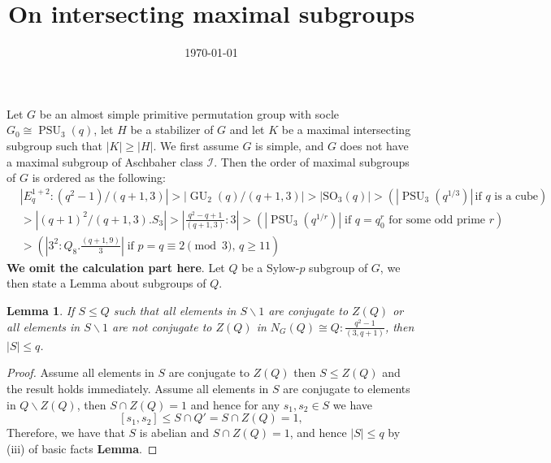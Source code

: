 \documentclass[12pt,reqno]{amsart}
\title[On intersecting maximal subgroups]{On intersecting maximal subgroups}
\date{\today}
\newcommand{\PSU}{\operatorname{PSU}}
\newcommand{\GU}{\operatorname{GU}}
\theoremstyle{plain}
\newtheorem{lemma}[proposition]{Lemma}
\theoremstyle{definition}
\begin{document}
	Let $G$ be an almost simple primitive permutation group with socle $G_0\cong \PSU_3(q)$, let $H$ be a stabilizer of $G$ and let $K$ be a maximal intersecting subgroup such that $|K|\ge |H|$.
	We first assume $G$ is simple, and $G$ does not have a maximal subgroup of Aschbaher class $\mathcal{I}$. Then the order of maximal subgroups of $G$ is ordered as the following:
	\begin{equation}\label{order}
		\begin{aligned}
		&|E_q^{1+2}{:}(q^2-1)/(q+1,3)|>|\GU_2(q)/(q+1,3)|>|\mathrm{SO}_3(q)|>(|\PSU_3(q^{1/3})|\, \text{if $q$ is a cube})\\
		&>|(q+1)^2/(q+1,3).S_3|>|\frac{q^2-q+1}{(q+1,3)}{:}3|>(|\PSU_3(q^{1/r})|\; \text{if $q=q_0^r$ for some odd prime $r$}) \\
		&>(|3^2{:}Q_8.\frac{(q+1,9)}{3}|\; \text{if $p=q\equiv 2\pmod 3$, $q\ge 11$})
	\end{aligned}
	\end{equation}
 \textbf{We omit the calculation part here}.
  Let $Q$ be a Sylow-$p$ subgroup of $G$, we then state a Lemma about subgroups of $Q$.
  \begin{lemma}\label{unipotent}
  	If $S\le Q$ such that all elements in $S\backslash 1$ are conjugate to $Z(Q)$ or all elements in $S\backslash 1$ are not conjugate to $Z(Q)$ in $N_G(Q)\cong Q{:}\frac{q^2-1}{(3,q+1)}$, then $|S|\le q$.
  \end{lemma}
  \begin{proof}
  	Assume all elements in $S$ are conjugate to $Z(Q)$ then $S\le Z(Q)$ and the result holds immediately. 
  	Assume all elements in $S$ are conjugate to elements in $Q\backslash Z(Q)$, then $S\cap Z(Q)=1$ and hence for any $s_1,s_2\in S$ we have 
  	 $$[s_1,s_2]\le S\cap Q'=S\cap Z(Q)=1,$$
  	 Therefore, we have that $S$ is abelian and $S\cap Z(Q)=1$, and hence $|S|\le q$ by (iii) of basic facts \textbf{Lemma}.
  \end{proof}
\end{document}
